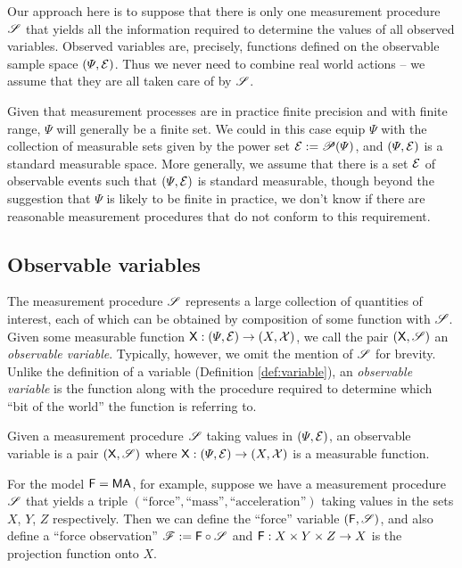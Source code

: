 Our approach here is to suppose that there is only one measurement procedure $\mathscr{S}$ that yields all the information required to determine the values of all observed variables. Observed variables are, precisely, functions defined on the observable sample space $(\Psi,\mathcal{E})$. Thus we never need to combine real world actions -- we assume that they are all taken care of by $\mathscr{S}$.

Given that measurement processes are in practice finite precision and with finite range, $\Psi$ will generally be a finite set. We could in this case equip $\Psi$ with the collection of measurable sets given by the power set $\mathcal{E}:=\mathscr{P}(\Psi)$, and $(\Psi,\mathcal{E})$ is a standard measurable space. More generally, we assume that there is a set $\mathcal{E}$ of observable events such that $(\Psi,\mathcal{E})$ is standard measurable, though beyond the suggestion that $\Psi$ is likely to be finite in practice, we don't know if there are reasonable measurement procedures that do not conform to this requirement.

\subsection{Observable variables}

The measurement procedure $\mathscr{S}$ represents a large collection of quantities of interest, each of which can be obtained by composition of some function with $\mathscr{S}$. Given some measurable function $\mathsf{X}:(\Psi,\mathcal{E})\to(X,\mathcal{X})$, we call the pair $(\mathsf{X},\mathscr{S})$ an \emph{observable variable}. Typically, however, we omit the mention of $\mathscr{S}$ for brevity. Unlike the definition of a variable (Definition \ref{def:variable}), an \emph{observable variable} is the function along with the procedure required to determine which ``bit of the world'' the function is referring to.

\begin{definition}
Given a measurement procedure $\mathscr{S}$ taking values in $(\Psi,\mathcal{E})$, an observable variable is a pair $(\mathsf{X},\mathscr{S})$ where $\mathsf{X}:(\Psi,\mathcal{E})\to (X,\mathcal{X})$ is a measurable function.
\end{definition}

For the model $\mathsf{F}=\mathsf{MA}$, for example, suppose we have a measurement procedure $\mathscr{S}$ that yields a triple $(\text{``force''},\text{``mass''},\text{``acceleration''})$ taking values in the sets $X$, $Y$, $Z$ respectively. Then we can define the ``force'' variable $(\mathsf{F}, \mathscr{S})$, and also define a ``force observation'' $\mathscr{F}:=\mathsf{F}\circ \mathscr{S}$ and $\mathsf{F}:X\times Y\times Z\to X$ is the projection function onto $X$.

